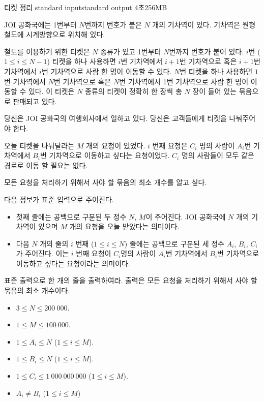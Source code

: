 \begin{problem}{티켓 정리}
	{standard input}{standard output}
	{4초}{256MB}{}
	
	JOI 공화국에는 1번부터 $N$번까지 번호가 붙은 $N$ 개의 기차역이 있다. 기차역은 원형 철도에 시계방향으로 위치해 있다.
	
	철도를 이용하기 위한 티켓은 $N$ 종류가 있고 1번부터 $N$번까지 번호가 붙어 있다. $i$번 ($1 \le i \le N-1$) 티켓을 하나 사용하면 $i$번 기차역에서 $i+1$번 기차역으로 혹은 $i+1$번 기차역에서 $i$번 기차역으로 사람 한 명이 이동할 수 있다. $N$번 티켓을 하나 사용하면 $1$번 기차역에서 $N$번 기차역으로 혹은 $N$번 기차역에서 1번 기차역으로 사람 한 명이 이동할 수 있다. 이 티켓은 $N$ 종류의 티켓이 정확히 한 장씩 총 $N$ 장이 들어 있는 묶음으로 판매되고 있다.
	
	당신은 JOI 공화국의 여행회사에서 일하고 있다. 당신은 고객들에게 티켓을 나눠주어야 한다.
	
	오늘 티켓을 나눠달라는 $M$ 개의 요청이 있었다. $i$ 번째 요청은 $C_i$ 명의 사람이 $A_i$번 기차역에서 $B_i$번 기차역으로 이동하고 싶다는 요청이었다. $C_i$ 명의 사람들이 모두 같은 경로로 이동 할 필요는 없다.
	
	모든 요청을 처리하기 위해서 사야 할 묶음의 최소 개수를 알고 싶다.

	\InputFile
	
	다음 정보가 표준 입력으로 주어진다.
	
	\begin{itemize}
		\item 첫째 줄에는 공백으로 구분된 두 정수 $N$, $M$이 주어진다. JOI 공화국에 $N$ 개의 기차역이 있으며 $M$ 개의 요청을 오늘 받았다는 의미이다.
		\item 다음 $N$ 개의 줄의 $i$ 번째 ($1 \le i \le N$) 줄에는 공백으로 구분된 세 정수 $A_i$, $B_i$, $C_i$가 주어진다. 이는 $i$ 번째 요청이 $C_i$명의 사람이 $A_i$번 기차역에서 $B_i$번 기차역으로 이동하고 싶다는 요청이라는 의미이다.
	\end{itemize}

	
	\OutputFile
	
	표준 출력으로 한 개의 줄을 출력하여라. 출력은 모든 요청을 처리하기 위해서 사야 할 묶음의 최소 개수이다.
	
	\Constraints
	
	\begin{itemize}
	
	\item $3 \le N \le 200\ 000$.
	\item $1 \le M \le 100\ 000$.
	\item $1 \le A_i \le N$ ($1 \le i \le M$).
	\item $1 \le B_i \le N$ ($1 \le i \le M$).
	\item $1 \le C_i \le 1\ 000\ 000\ 000$ ($1 \le i \le M$).
	\item $A_i \ne B_i$ ($1 \le i \le M$)
	\end{itemize}
	

\end{problem}
